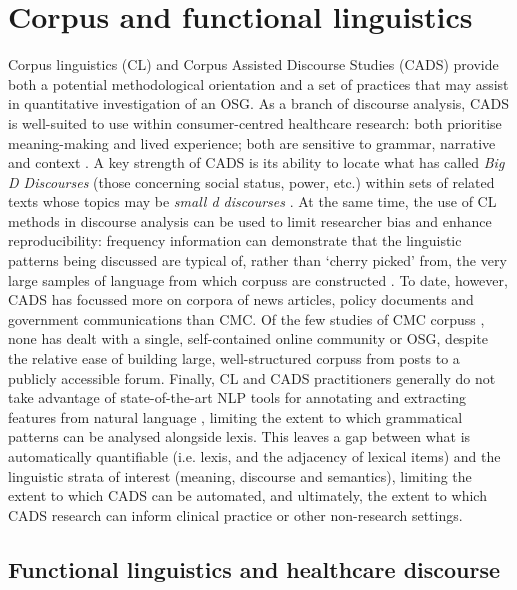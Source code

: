 \documentclass{article}
\renewcommand{\cite}{\parencite}
\begin{document}
\section{Corpus and functional linguistics}

Corpus linguistics (CL) and Corpus Assisted Discourse Studies (CADS) provide both a potential methodological orientation and a set of practices that may assist in quantitative investigation of an OSG. As a branch of discourse analysis, CADS is well-suited to use within consumer-centred healthcare research: both prioritise meaning-making and lived experience; both are sensitive to grammar, narrative and context \cite{crawford_language_2013,partington_corpora_2004}. A key strength of CADS is its ability to locate what \textcite{gee_social_2007} has called \emph{Big D Discourses} (those concerning social status, power, etc.) within sets of related texts whose topics may be \emph{small d discourses} \cite[about particular things and events in the world; see][]{baker_corpora_2013}. At the same time, the use of CL methods in discourse analysis can be used to limit researcher bias and enhance reproducibility: frequency information can demonstrate that the linguistic patterns being discussed are typical of, rather than `cherry picked' from, the very large samples of language from which corpuss are constructed \cite{baker_acceptable_2012}. To date, however, CADS has focussed more on corpora of news articles, policy documents and government communications than CMC. Of the few studies of CMC corpuss \cite[e.g.][]{harvey_am_2007,harvey_disclosures_2012,prentice_using_2010}, none has dealt with a single, self-contained online community or OSG, despite the relative ease of building large, well-structured corpuss from posts to a publicly accessible forum. Finally, CL and CADS practitioners generally do not take advantage of state-of-the-art NLP tools for annotating and extracting features from natural language \cite{groom_corpora_2015}, limiting the extent to which grammatical patterns can be analysed alongside lexis. This leaves a gap between what is automatically quantifiable (i.e. lexis, and the adjacency of lexical items) and the linguistic strata of interest (meaning, discourse and semantics), limiting the extent to which CADS can be automated, and ultimately, the extent to which CADS research can inform clinical practice or other non-research settings.

\subsection{Functional linguistics and healthcare discourse}
\end{document}

